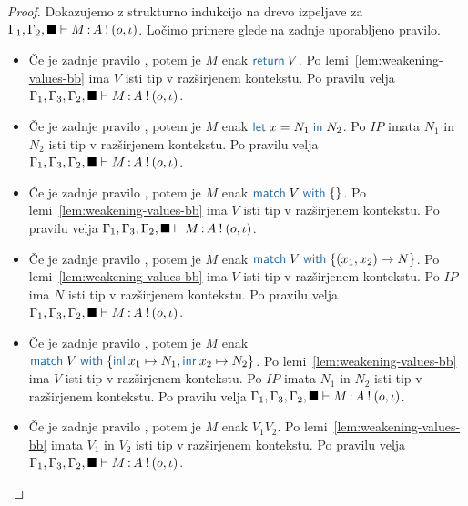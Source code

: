 \begin{proof}
	Dokazujemo z strukturno indukcijo na drevo izpeljave za $\Gamma_1, \Gamma_2, \blacksquare \vdash M \mathinner{:} A \mathbin{!} (o, \iota)$.
	Ločimo primere glede na zadnje uporabljeno pravilo.
	
	\begin{itemize}
		\item Če je zadnje pravilo , potem je $M$ enak $\tmreturn{V}$.
		Po lemi~\ref{lem:weakening-values-bb} ima $V$ isti tip v razširjenem kontekstu.
		Po pravilu  velja $\Gamma_1, \Gamma_3, \Gamma_2, \blacksquare \vdash M \mathinner{:} A \mathbin{!} (o, \iota)$.
		
		\item Če je zadnje pravilo , potem je $M$ enak $\tmlet{x}{N_1}{N_2}$.
		Po $IP$ imata $N_1$ in $N_2$ isti tip v razširjenem kontekstu.
		Po pravilu  velja $\Gamma_1, \Gamma_3, \Gamma_2, \blacksquare \vdash M \mathinner{:} A \mathbin{!} (o, \iota)$.
		
		\item Če je zadnje pravilo , potem je $M$ enak $\tmmatch{V}{}$.
		Po lemi~\ref{lem:weakening-values-bb} ima $V$ isti tip v razširjenem kontekstu.
		Po pravilu  velja $\Gamma_1, \Gamma_3, \Gamma_2, \blacksquare \vdash M \mathinner{:} A \mathbin{!} (o, \iota)$.
		
		\item Če je zadnje pravilo , potem je $M$ enak $\tmmatch{V}{(x_1,x_2) \mapsto N}$. 
		Po lemi~\ref{lem:weakening-values-bb} ima $V$ isti tip v razširjenem kontekstu.
		Po $IP$ ima $N$ isti tip v razširjenem kontekstu.
		Po pravilu  velja $\Gamma_1, \Gamma_3, \Gamma_2, \blacksquare \vdash M \mathinner{:} A \mathbin{!} (o, \iota)$.
		
		\item Če je zadnje pravilo , potem je $M$ enak $\tmmatch{V}{\tminl{x_1} \mapsto N_1, \tminr{x_2} \mapsto N_2}$.
		Po lemi~\ref{lem:weakening-values-bb} ima $V$ isti tip v razširjenem kontekstu.
		Po $IP$ imata $N_1$ in $N_2$ isti tip v razširjenem kontekstu.
		Po pravilu  velja $\Gamma_1, \Gamma_3, \Gamma_2, \blacksquare \vdash M \mathinner{:} A \mathbin{!} (o, \iota)$.
		
		\item Če je zadnje pravilo , potem je $M$ enak $V_1 V_2$.
		Po lemi~\ref{lem:weakening-values-bb} imata $V_1$ in $V_2$ isti tip v razširjenem kontekstu.
		Po pravilu  velja $\Gamma_1, \Gamma_3, \Gamma_2, \blacksquare \vdash M \mathinner{:} A \mathbin{!} (o, \iota)$.
		

\end{itemize}
\end{proof}
